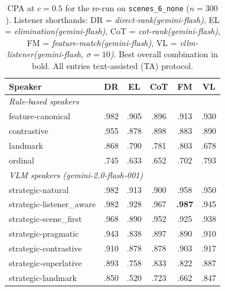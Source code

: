 
\begin{table}[ht]
\centering
\small
\setlength{\tabcolsep}{4pt}
\begin{tabular}{lccccc}
\toprule
Speaker & DR & EL & CoT & FM & VL \\
\midrule
\multicolumn{6}{l}{\textit{Rule-based speakers}} \\
feature-canonical          & .982 & .905 & .896 & .913 & .930 \\
contrastive                & .955 & .878 & .898 & .883 & .890 \\
landmark                   & .868 & .790 & .781 & .803 & .678 \\
ordinal                    & .745 & .633 & .652 & .702 & .793 \\
\midrule
\multicolumn{6}{l}{\textit{VLM speakers (gemini-2.0-flash-001)}} \\
strategic-natural          & .982 & .913 & .900 & .958 & .950 \\
strategic-listener\_aware  & .982 & .928 & .967 & \textbf{.987} & .945 \\
strategic-scene\_first     & .968 & .890 & .952 & .925 & .938 \\
strategic-pragmatic        & .943 & .838 & .897 & .890 & .910 \\
strategic-contrastive      & .910 & .878 & .878 & .903 & .917 \\
strategic-superlative      & .893 & .758 & .833 & .822 & .887 \\
strategic-landmark         & .850 & .520 & .723 & .662 & .847 \\
\bottomrule
\end{tabular}
\caption{CPA at $c{=}0.5$ for the re-run on \texttt{scenes\_6\_none}
         ($n{=}300$). Listener shorthands:
         DR = \textit{direct-rank(gemini-flash)},
         EL = \textit{elimination(gemini-flash)},
         CoT = \textit{cot-rank(gemini-flash)},
         FM = \textit{feature-match(gemini-flash)},
         VL = \textit{vllm-listener(gemini-flash, $\sigma{=}10$)}.
         Best overall combination in bold.
         All entries text-assisted (TA) protocol.}
\label{tab:rerun_c05_scenes6none}
\end{table}

